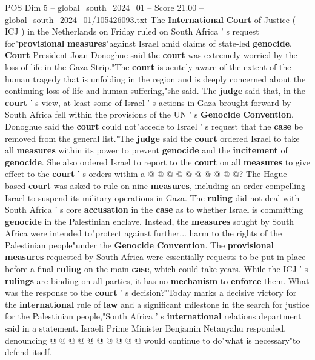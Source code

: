 \begin{textsample}{POS Dim 5 – global\_south\_2024\_01 – Score 21.00 – global\_south\_2024\_01/105426093.txt}  \label{ex:f5_pos_010}
The \textbf{International} \textbf{Court} of Justice ( ICJ ) in the Netherlands on Friday ruled on South Africa ' s request for"\textbf{provisional} \textbf{measures}"against Israel amid claims of state-led \textbf{genocide}. \textbf{Court} President Joan Donoghue said the \textbf{court} was extremely worried by the loss of life in the Gaza Strip."The \textbf{court} is acutely aware of the extent of the human tragedy that is unfolding in the region and is deeply concerned about the continuing loss of life and human suffering,"she said.
The \textbf{judge} said that, in the \textbf{court} ' s view, at least some of Israel ' s actions in Gaza brought forward by South Africa fell within the provisions of the UN ' s \textbf{Genocide} \textbf{Convention}.
Donoghue said the \textbf{court} could not"accede to Israel ' s request that the \textbf{case} be removed from the general list."The \textbf{judge} said the \textbf{court} ordered Israel to take all \textbf{measures} within its power to prevent \textbf{genocide} and the \textbf{incitement} of \textbf{genocide}.
She also ordered Israel to report to the \textbf{court} on all \textbf{measures} to give effect to the \textbf{court} ' s orders within a @ @ @ @ @ @ @ @ @ @?
The Hague-based \textbf{court} was asked to rule on nine \textbf{measures}, including an order compelling Israel to suspend its military operations in Gaza.
The \textbf{ruling} did not deal with South Africa ' s core \textbf{accusation} in the \textbf{case} as to whether Israel is committing \textbf{genocide} in the Palestinian enclave.
Instead, the \textbf{measures} sought by South Africa were intended to"protect against further... harm to the rights of the Palestinian people"under the \textbf{Genocide} \textbf{Convention}.
The \textbf{provisional} \textbf{measures} requested by South Africa were essentially requests to be put in place before a final \textbf{ruling} on the main \textbf{case}, which could take years.
While the ICJ ' s \textbf{rulings} are binding on all parties, it has no \textbf{mechanism} to \textbf{enforce} them.
What was the response to the \textbf{court} ' s decision?"Today marks a decisive victory for the \textbf{international} rule of \textbf{law} and a significant milestone in the search for justice for the Palestinian people,"South Africa ' s \textbf{international} relations department said in a statement.
Israeli Prime Minister Benjamin Netanyahu responded, denouncing @ @ @ @ @ @ @ @ @ @ would continue to do"what is necessary"to defend itself.

\end{textsample}
